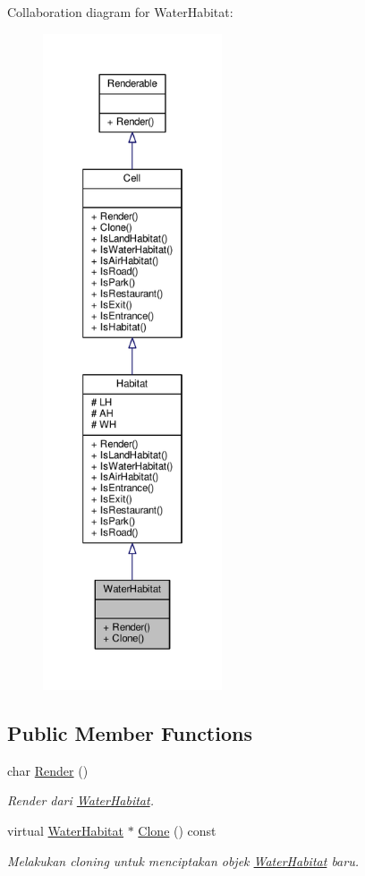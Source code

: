 Collaboration diagram for Water\+Habitat\+:
\nopagebreak
\begin{figure}[H]
\begin{center}
\leavevmode
\includegraphics[height=550pt]{classWaterHabitat__coll__graph}
\end{center}
\end{figure}
\subsection*{Public Member Functions}
\begin{DoxyCompactItemize}
\item 
char \hyperlink{classWaterHabitat_a014ef4d2a9e5f37ac70a61d3f060b983}{Render} ()
\begin{DoxyCompactList}\small\item\em Render dari \hyperlink{classWaterHabitat}{Water\+Habitat}. \end{DoxyCompactList}\item 
virtual \hyperlink{classWaterHabitat}{Water\+Habitat} $\ast$ \hyperlink{classWaterHabitat_a6ae8f71f1b999dd7802acd1f5fb71bea}{Clone} () const 
\begin{DoxyCompactList}\small\item\em Melakukan cloning untuk menciptakan objek \hyperlink{classWaterHabitat}{Water\+Habitat} baru. \end{DoxyCompactList}\end{DoxyCompactItemize}
